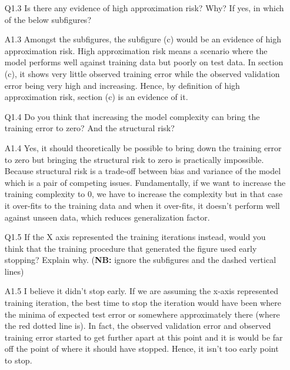 \documentclass[11pt]{scrartcl}
\begin{document}
\begin{itemize}
\item[Q1.3] Is there any evidence of high approximation risk? Why? If yes, in which of the below subfigures?  
\item[A1.3] Amongst the subfigures, the subfigure (c) would be an evidence of high approximation risk. High approximation risk means a scenario where the model performs well against training data but poorly on test data. In section (c), it shows very little observed training error while the observed validation error being very high and increasing. Hence, by definition of high approximation risk, section (c) is an evidence of it.\\

\item[Q1.4] Do you think that increasing the model complexity can bring the training error to zero? And the structural risk?  
\item[A1.4] Yes, it should theoretically be possible to bring down the training error to zero but bringing the structural risk to zero is practically impossible. Because structural risk is a trade-off between bias and variance of the model which is a pair of competing issues. Fundamentally, if we want to increase the training complexity to 0, we have to increase the complexity but in that case it over-fits to the training data and when it over-fits, it doesn't perform well against unseen data, which reduces generalization factor.\\

\item[Q1.5] If the X axis represented the training iterations instead, would you think that the training procedure that generated the figure used early stopping? Explain why. (\textbf{NB:} ignore the subfigures and the dashed vertical lines)
\item[A1.5] I believe it didn't stop early. If we are assuming the x-axis represented training iteration, the best time to stop the iteration would have been where the minima of expected test error or somewhere approximately there (where the red dotted line is). In fact, the observed validation error and observed training error started to get further apart at this point and it is would be far off the point of where it should have stopped. Hence, it isn't too early point to stop.\\

\end{itemize}
\end{document}
